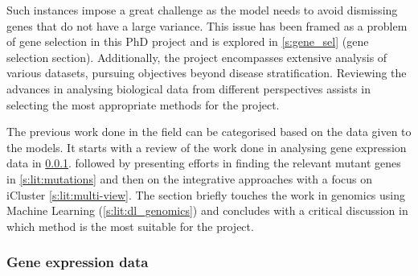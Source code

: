 Such instances impose a great challenge as the model needs to avoid dismissing genes that do not have a large variance. This issue has been framed as a problem of gene selection in this PhD project and is explored in \cref{s:gene_sel} (gene selection section). Additionally, the project encompasses extensive analysis of various datasets, pursuing objectives beyond disease stratification. Reviewing the advances in analysing biological data from different perspectives assists in selecting the most appropriate methods for the project.


The previous work done in the field can be categorised based on the data given to the models. 
It starts with a review of the work done in analysing gene expression data in \ref{s:lit:rnaSeq}. followed by presenting efforts in finding the relevant mutant genes in \ref{s:lit:mutations} and then on the integrative approaches with a focus on iCluster \ref{s:lit:multi-view}. The section briefly touches the work in genomics using Machine Learning (\ref{s:lit:dl_genomics}) and concludes with a critical discussion in which method is the most suitable for the project.

\subsubsection{Gene expression data} \label{s:lit:rnaSeq}

\vspace{3mm}
\vspace{3mm}

